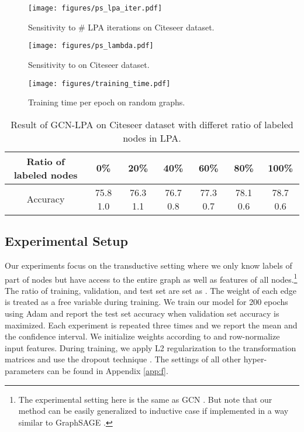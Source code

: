 \documentclass{article}
\begin{document}
		\begin{figure*}[t]
		    \begin{minipage}[t]{0.3\linewidth}
		        \centering 
    			\texttt{[image: figures/ps\_lpa\_iter.pdf]}
    			\caption{Sensitivity to \# LPA iterations on Citeseer dataset.} 
    			\label{fig:ps_lpa_iter}
  			\end{minipage}
  			\hfill
		    \begin{minipage}[t]{0.3\linewidth} 
    			\centering 
    			\texttt{[image: figures/ps\_lambda.pdf]}
    			\caption{Sensitivity to  on Citeseer dataset.} 
    			\label{fig:ps_lambda}
  			\end{minipage}
  			\hfill
  			\begin{minipage}[t]{0.3\linewidth} 
    			\centering 
    			\texttt{[image: figures/training\_time.pdf]}
    			\caption{Training time per epoch on random graphs.} 
    			\label{fig:training_time}
  			\end{minipage}
		\end{figure*}
		
		\begin{table*}[t]
			\centering
			\setlength{\tabcolsep}{8pt}
			\begin{tabular}{c|cccccc}
				\hline
				Ratio of labeled nodes & 0\% & 20\% & 40\% & 60\% & 80\% & 100\% \\
				\hline
				Accuracy & 75.8  1.0 & 76.3  1.1 & 76.7  0.8 & 77.3  0.7 & 78.1  0.6 & 78.7  0.6 \\
				\hline
			\end{tabular}
			\caption{Result of GCN-LPA on Citeseer dataset with differet ratio of labeled nodes in LPA.}
			\label{table:ratio}
		\end{table*}
		
		
	\subsection{Experimental Setup}
		Our experiments focus on the transductive setting where we only know labels of part of nodes but have access to the entire graph as well as features of all nodes.\footnote{The experimental setting here is the same as GCN \citep{kipf2017semi}. But note that our method can be easily generalized to inductive case if implemented in a way similar to GraphSAGE \citep{hamilton2017inductive}.}
		The ratio of training, validation, and test set are set as .
		The weight of each edge is treated as a free variable during training.
		We train our model for 200 epochs using Adam \citep{kingma2015adam} and report the test set accuracy when validation set accuracy is maximized.
		Each experiment is repeated three times and we report the mean and the  confidence interval.
		We initialize weights according to \cite{glorot2010understanding} and row-normalize input features.
		During training, we apply L2 regularization to the transformation matrices and use the dropout technique \citep{nitish2014dropout}.
		The settings of all other hyper-parameters can be found in Appendix \ref{app:f}.
\end{document}
